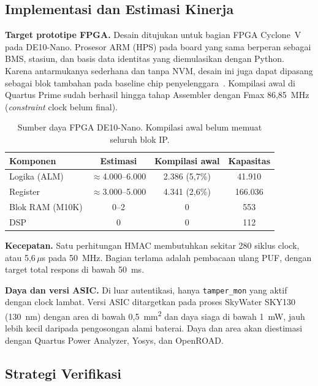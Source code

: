 \documentclass[11pt,a4paper]{article}
\newcommand{\hdr}[1]{\cellcolor{hdrgreen}\textbf{#1}}
\renewcommand{\arraystretch}{1.3}
\begin{document}
\subsection{Implementasi dan Estimasi Kinerja}

\textbf{Target prototipe FPGA.} Desain ditujukan untuk bagian FPGA Cyclone~V pada DE10-Nano. Prosesor ARM (HPS) pada board yang sama berperan sebagai BMS, stasiun, dan basis data identitas yang diemulasikan dengan Python. Karena antarmukanya sederhana dan tanpa NVM, desain ini juga dapat dipasang sebagai blok tambahan pada baseline chip penyelenggara~\cite{peruri}. Kompilasi awal di Quartus Prime sudah berhasil hingga tahap Assembler dengan Fmax 86,85~MHz (\emph{constraint} clock belum final).

\begin{table}[!b]
\centering
\small
\renewcommand{\arraystretch}{1.15}
\begin{tabular}{|l|c|c|c|}
\hline
\hdr{Komponen} & \hdr{Estimasi} & \hdr{Kompilasi awal} & \hdr{Kapasitas} \\ \hline
Logika (ALM) & $\approx$4.000--6.000 & 2.386 (5,7\%) & 41.910 \\ \hline
Register & $\approx$3.000--5.000 & 4.341 (2,6\%) & 166.036 \\ \hline
Blok RAM (M10K) & 0--2 & 0 & 553 \\ \hline
DSP & 0 & 0 & 112 \\ \hline
\end{tabular}
\caption{Sumber daya FPGA DE10-Nano. Kompilasi awal belum memuat seluruh blok IP.}
\end{table}

\textbf{Kecepatan.} Satu perhitungan HMAC membutuhkan sekitar 280 siklus clock, atau 5,6\,$\mu$s pada 50~MHz. Bagian terlama adalah pembacaan ulang PUF, dengan target total respons di bawah 50~ms.

\textbf{Daya dan versi ASIC.} Di luar autentikasi, hanya \texttt{tamper\_mon} yang aktif dengan clock lambat. Versi ASIC ditargetkan pada proses SkyWater SKY130 (130~nm) dengan area di bawah 0,5~mm\textsuperscript{2} dan daya siaga di bawah 1~mW, jauh lebih kecil daripada pengosongan alami baterai. Daya dan area akan diestimasi dengan Quartus Power Analyzer, Yosys, dan OpenROAD.

\subsection{Strategi Verifikasi}
\end{document}
